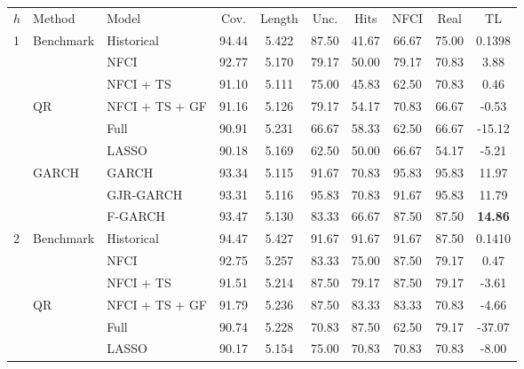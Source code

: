 \begin{tabular}{llp{10em}ccccccc}
  \toprule
{$h$} & {Method} & {Model} & 
  {Cov.} & {Length} & {Unc.}  & {Hits} & {NFCI} 
  & {Real}& {TL} \\
  \cmidrule{1-1} \cmidrule(lr){2-3} \cmidrule(lr){4-5}
  \cmidrule(lr){6-9} \cmidrule(lr){10-10}
    

\multirow{9}{*}{{1}} &
                      \multirow{1}{*}{{Benchmark}} & Historical & 94.44 & 5.422 & 87.50 & 41.67 & 66.67 & 75.00 & 0.1398 \\  \cmidrule(lr){2-3}\cmidrule(lr){4-5} \cmidrule(lr){6-9} \cmidrule(lr){10-10}
& &   NFCI & 92.77 & 5.170 & 79.17 & 50.00 & 79.17 & 70.83 & 3.88 \\ 
& &   NFCI + TS & 91.10 & 5.111 & 75.00 & 45.83 & 62.50 & 70.83 & 0.46 \\ 
& \multirow{1}{*}{{QR}} &    NFCI + TS + GF  & 91.16 & 5.126 & 79.17 & 54.17 & 70.83 & 66.67 & -0.53 \\ 
& &   Full & 90.91 & 5.231 & 66.67 & 58.33 & 62.50 & 66.67 & -15.12 \\ 
& &   LASSO & 90.18 & 5.169 & 62.50 & 50.00 & 66.67 & 54.17 & -5.21 \\  \cmidrule(lr){2-3}\cmidrule(lr){4-5} \cmidrule(lr){6-9} \cmidrule(lr){10-10}
& \multirow{3}{*}{{GARCH}} &    GARCH & 93.34 & 5.115 & 91.67 & 70.83 & 95.83 & 95.83 & 11.97 \\ 
& &   GJR-GARCH & 93.31 & 5.116 & 95.83 & 70.83 & 91.67 & 95.83 & 11.79 \\ 
& &   F-GARCH & 93.47 & 5.130 & 83.33 & 66.67 & 87.50 & 87.50 & \textbf{14.86} \\  \toprule
\multirow{9}{*}{{2}} &
                      \multirow{1}{*}{{Benchmark}} & Historical & 94.47 & 5.427 & 91.67 & 91.67 & 91.67 & 87.50 & 0.1410 \\  \cmidrule(lr){2-3}\cmidrule(lr){4-5} \cmidrule(lr){6-9} \cmidrule(lr){10-10}
& &   NFCI & 92.75 & 5.257 & 83.33 & 75.00 & 87.50 & 79.17 & 0.47 \\ 
& &   NFCI + TS & 91.51 & 5.214 & 87.50 & 79.17 & 87.50 & 79.17 & -3.61 \\ 
& \multirow{1}{*}{{QR}} &    NFCI + TS + GF  & 91.79 & 5.236 & 87.50 & 83.33 & 83.33 & 70.83 & -4.66 \\ 
& &   Full & 90.74 & 5.228 & 70.83 & 87.50 & 62.50 & 79.17 & -37.07 \\ 
& &   LASSO & 90.17 & 5.154 & 75.00 & 70.83 & 70.83 & 70.83 & -8.00 \\  \cmidrule(lr){2-3}\cmidrule(lr){4-5} \cmidrule(lr){6-9} \cmidrule(lr){10-10}

\end{tabular}
